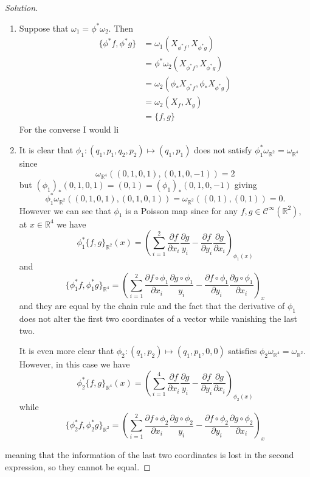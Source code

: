 \begin{proof}[Solution]\leavevmode
	\begin{enumerate}[label=\alph*.]
		\item Suppose that $\omega_1=\phi^*\omega_2$. Then
			\begin{align*}
				\{\phi^*f,\phi^*g\} & =\omega_1(X_{\phi^*f},X_{\phi^*g})\\
						    &=\phi^* \omega_2(X_{\phi^*f},X_{\phi^*g})\\
						    & =\omega_2(\phi_*X_{\phi^*f},\phi_{*} X_{\phi^*g})\\
						    & =\omega_2(X_f,X_g)\\
						    & =\{f,g\}
			\end{align*}
	For the converse I would li

	\item It is clear that $\phi_1:(q_1,p_1,q_2,p_2)\mapsto (q_1,p_1)$ does not satisfy $\phi_1^*\omega_{\mathbb{R}^{2}}=\omega_{\mathbb{R}^{4}}$ since 
		\[\omega_{\mathbb{R}^{4}}((0,1,0,1),(0,1,0,-1))=2\]
		but $(\phi_1)_{*}(0,1,0,1)=(0,1)=(\phi_1)_*(0,1,0,-1)$ giving 
		\[\phi_1^*\omega_{\mathbb{R}^{2}}((0,1,0,1),(0,1,0,1))=\omega_{\mathbb{R}^{2}}((0,1),(0,1))=0.\]
		However we can see that $\phi_1$ is a Poisson map since for any $f,g\in\mathcal{C}^\infty(\mathbb{R}^{2})$, at $x\in\mathbb{R}^{4}$ we have
		\[\phi_1^*\{f,g\}_{\mathbb{R}^{2}}(x)=\left( \sum_{i=1}^2\frac{\partial f}{\partial x_i}\frac{\partial g}{y_i}-\frac{\partial f}{\partial y_i}\frac{\partial g}{\partial x_i} \right)_{\phi_1(x)} \]
and
\[\{\phi_1^*f,\phi_1^*g\}_{\mathbb{R}^{4}} =\left( \sum_{i=1}^2\frac{\partial f\circ \phi_1}{\partial x_i}\frac{\partial g\circ \phi_1}{y_i}-\frac{\partial f\circ \phi_1}{\partial y_i}\frac{\partial g\circ \phi_1}{\partial x_i} \right)_x\]
and they are equal by the chain rule and the fact that the derivative of $\phi_1$ does not alter the first two coordinates of a vector while vanishing the last two.


		It is even more clear that $\phi_2:(q_1,p_2)\mapsto (q_1,p_1,0,0)$ satisfies $\phi_2\omega_{\mathbb{R}^{4}}=\omega_{\mathbb{R}^{2}}$. However, in this case we have
		\[\phi_2^*\{f,g\}_{\mathbb{R}^{4}}(x)=\left( \sum_{i=1}^4\frac{\partial f}{\partial x_i}\frac{\partial g}{y_i}-\frac{\partial f}{\partial y_i}\frac{\partial g}{\partial x_i} \right)_{\phi_2(x)} \]
		while
\[\{\phi_2^*f,\phi_2^*g\}_{\mathbb{R}^{2}} =\left( \sum_{i=1}^2\frac{\partial f\circ \phi_2}{\partial x_i}\frac{\partial g\circ \phi_2}{y_i}-\frac{\partial f\circ \phi_2}{\partial y_i}\frac{\partial g\circ \phi_2}{\partial x_i} \right)_x\]
	\end{enumerate}
	meaning that the information of the last two coordinates is lost in the second expression, so they cannot be equal.
	\end{proof}


